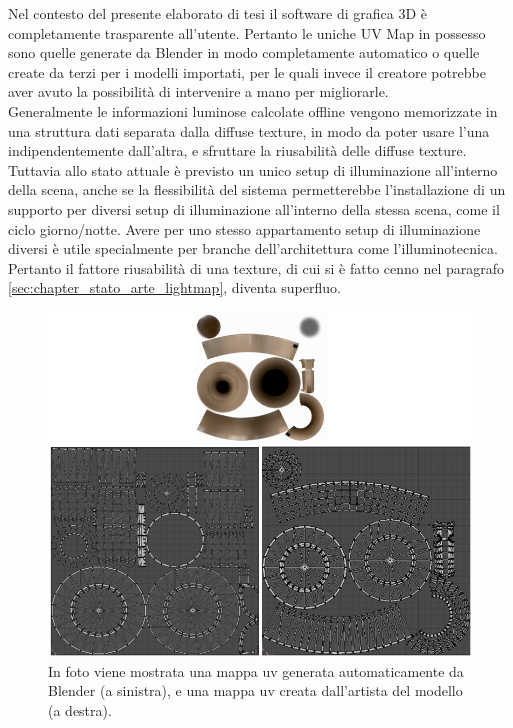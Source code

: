 Nel contesto del presente elaborato di tesi il software di grafica 3D è completamente trasparente all’utente. Pertanto le uniche UV Map in possesso sono quelle generate da Blender in modo completamente automatico o quelle create da terzi per i modelli importati, per le quali invece il creatore potrebbe aver avuto la possibilità di intervenire a mano per migliorarle.
\\
Generalmente le informazioni luminose calcolate offline vengono memorizzate in una struttura dati separata dalla diffuse texture, in modo da poter usare l’una indipendentemente dall’altra, e sfruttare la riusabilità delle diffuse texture.
\\ 
Tuttavia allo stato attuale è previsto un unico setup di illuminazione all’interno della scena, anche se la flessibilità del sistema permetterebbe l’installazione di un supporto per diversi setup di illuminazione all’interno della stessa scena, come il ciclo giorno/notte.  Avere per uno stesso appartamento setup di illuminazione diversi è utile specialmente per branche dell’architettura come l’illuminotecnica. Pertanto il fattore riusabilità di una texture, di cui si è fatto cenno nel paragrafo \ref{sec:chapter_stato_arte_lightmap}, diventa superfluo. 
\\
\begin{figure}[htb]
 \centering
 \includegraphics[width=1\linewidth]{images/chapter_lrl/lrl_diff_uvmap.png}\hfill
 \caption[Confronto UV Map]{In foto viene mostrata una mappa uv generata automaticamente da Blender (a sinistra), e una mappa uv creata dall'artista del modello (a destra).}
 \label{fig:lrl_diff_uvmap}
\end{figure}
